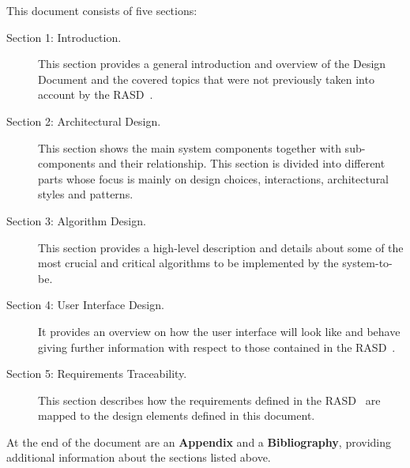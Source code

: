 This document consists of five sections:

\begin{description}
\item[Section 1: Introduction.] This section provides a general introduction and overview of the Design Document and the covered topics that were not previously taken into account by the RASD~\cite{rasd}.
\item[Section 2: Architectural Design.] This section shows the main system components together with sub-components and their relationship. This section is divided into different parts whose focus is mainly on design choices, interactions, architectural styles and patterns.
\item[Section 3: Algorithm Design.] This section provides a high-level description and details about some of the most crucial and critical algorithms to be implemented by the system-to-be.
\item[Section 4: User Interface Design.] It provides an overview on how the user interface will look like and behave giving further information with respect to those contained in the RASD~\cite{rasd}.
\item[Section 5: Requirements Traceability.] This section describes how the requirements defined in the RASD~\cite{rasd} are mapped to the design elements defined in this document.
\end{description}
At the end of the document are an \textbf{Appendix} and a \textbf{Bibliography}, providing additional information about the sections listed above.